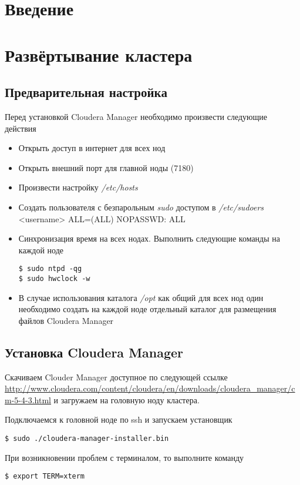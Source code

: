 \chapter{Введение}

\chapter{Развёртывание кластера}
\section{Предварительная настройка}
Перед установкой Cloudera Manager необходимо произвести следующие действия
\begin{itemize}
    \item Открыть доступ в интернет для всех нод
    \item Открыть внешний порт для главной ноды (7180)
    \item Произвести настройку \emph{/etc/hosts}
    \item Создать пользователя с безпарольным \emph{sudo} доступом в \emph{/etc/sudoers}\\
        <username> ALL=(ALL) NOPASSWD: ALL
    \item Синхронизация время на всех нодах. Выполнить следующие команды на каждой ноде
\begin{lstlisting}
$ sudo ntpd -qg
$ sudo hwclock -w
\end{lstlisting}
    \item В случае использования каталога \emph{/opt} как общий для всех нод один необходимо
    создать на каждой ноде отдельный каталог для размещения файлов Cloudera Manager
\end{itemize}

\newpage

\section{Установка Cloudera Manager}
Скачиваем Clouder Manager доступное по следующей ссылке 
\url{http://www.cloudera.com/content/cloudera/en/downloads/cloudera_manager/cm-5-4-3.html} и 
загружаем на головную ноду кластера.

Подключаемся к головной ноде по ssh и запускаем установщик
\begin{lstlisting}
$ sudo ./cloudera-manager-installer.bin
\end{lstlisting}

При возникновении проблем с терминалом, то выполните команду
\begin{lstlisting}
$ export TERM=xterm
\end{lstlisting}

